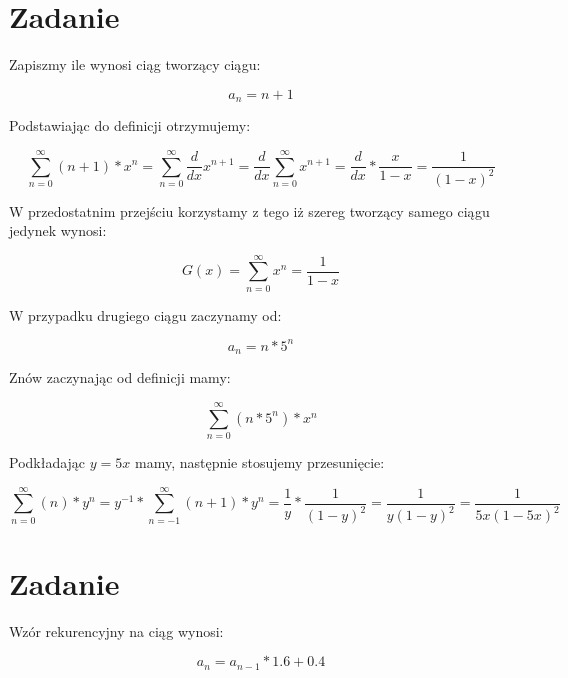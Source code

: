 \documentclass[paper=a4, fontsize=11pt]{scrartcl} %
\numberwithin{equation}{section} %
\numberwithin{figure}{section} %
\numberwithin{table}{section} %
\begin{document}
\section{Zadanie}

Zapiszmy ile wynosi ciąg tworzący ciągu:

\begin{equation}
  a_n = n + 1
\end{equation}

Podstawiając do definicji otrzymujemy:

\begin{equation}
  \sum_{n=0}^{\infty} (n + 1)* x^n = \sum_{n=0}^{\infty} \frac{d}{dx}x^{n+1}=\frac{d}{dx}\sum_{n=0}^{\infty} x^{n+1} = \frac{d}{dx} * \frac{x}{1 - x} = \frac{1}{(1-x)^2}
\end{equation}

W przedostatnim przejściu korzystamy z tego iż szereg tworzący samego ciągu jedynek wynosi:

\begin{equation}
  G(x) = \sum_{n=0}^{\infty}x^n = \frac{1}{1 - x} 
\end{equation}


W przypadku drugiego ciągu zaczynamy od:

\begin{equation}
  a_n = n * 5 ^n 
\end{equation}

Znów zaczynając od definicji mamy:

\begin{equation}
  \sum_{n=0}^{\infty} (n * 5^n )* x^n
\end{equation}

Podkładając \(y = 5x\) mamy, następnie stosujemy przesunięcie:

\begin{equation}
  \sum_{n=0}^{\infty} (n)* y^n = y^{-1} * \sum_{n=-1}^{\infty} (n + 1)* y^n = \frac{1}{y} * \frac{1}{(1-y)^2}= \frac{1}{y(1-y)^2}= \frac{1}{5x(1-5x)^2}
\end{equation}

\section{Zadanie}

Wzór rekurencyjny na ciąg wynosi:

\begin{equation}
  a_n = a_{n-1} * 1.6 + 0.4
\end{equation}
\end{document}
